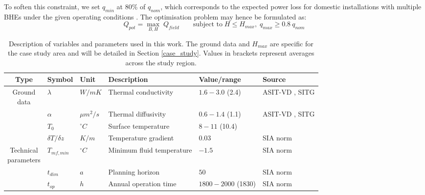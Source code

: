 To soften this constraint, we set $q_{min}$ at 80\% of $q_{nom}$, which corresponds to the expected power loss for domestic installations with multiple BHEs under the given operating conditions \cite{sia_sondes_2010}.
The optimisation problem may hence be formulated as: 
%
\begin{equation}
\label{eq:optimisation}
    Q_{pot} = \max_{B, H} \; Q_{field} \quad \quad \text{subject to} \; H \leq H_{max}, \; q_{max} \geq 0.8 \ q_{nom}
\end{equation}

\begin{landscape}
\begin{table}[b]
\footnotesize
\caption{Description of variables and parameters used in this work. The ground data and $H_{max}$ are specific for the case study area and will be detailed in Section \ref{case_study}. Values in brackets represent averages across the study region.}
\centering
\begin{tabular}{clllll}
\hline
\textbf{Type} & \textbf{Symbol}             & \textbf{Unit} & \textbf{Description}           & \textbf{Value/range} & \textbf{Source} \\ \hline
\multirowcell{4}{Ground \\ data}
& $\lambda$           & $W/mK$        & Thermal conductivity         & $1.6-3.0$ (2.4) 
& ASIT-VD \cite{asit_vd_cadastre_2019-1}, SITG \cite{sitg_cadastre_2019}      \\
& $\alpha$            & $\mu m^2/s$       & Thermal diffusivity          & $0.6-1.4$ (1.1)   
& ASIT-VD \cite{asit_vd_cadastre_2019-1}, SITG \cite{sitg_cadastre_2019}            \\
& $T_0$               & $^\circ C$    & Surface temperature          & $8 - 11$ (10.4)  
& \citet{assouline_machine_2019}              \\
& $\delta T/\delta z$ & $K/m$         & Temperature gradient         & 0.03     
& SIA norm \cite{sia_sondes_2010} \\
\hline
\multirowcell{6}{Technical \\ parameters}
& $T_{mf, min}$      & $^\circ C$    & Minimum fluid temperature     & $- 1.5$      
& SIA norm \cite{sia_sondes_2010}  \\
& $t_{dim}$          & $a$           & Planning horizon              & $50$               
& SIA norm \cite{sia_sondes_2010}  \\ 
& $t_{op}$           & $h$           & Annual operation time         & $1800-2000$ (1830)
& SIA norm \cite{sia_sondes_2010}  \\

\end{tabular}
\end{table}
\end{landscape}

